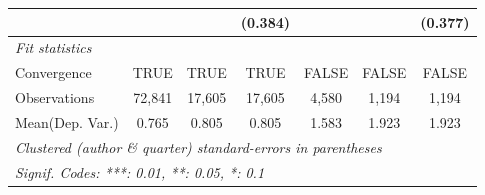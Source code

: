 \begin{tabular}{lcccccc}
                           &         &         & (0.384) &               &             & (0.377)\\   
   \midrule
   \emph{Fit statistics}\\
   Convergence             &TRUE     & TRUE    & TRUE    & FALSE         & FALSE       & FALSE\\  
   Observations            & 72,841  & 17,605  & 17,605  & 4,580         & 1,194       & 1,194\\  
Mean(Dep. Var.) & 0.765 & 0.805 & 0.805 & 1.583 & 1.923 & 1.923 \\
   \midrule \midrule
   \multicolumn{7}{l}{\emph{Clustered (author \& quarter) standard-errors in parentheses}}\\
   \multicolumn{7}{l}{\emph{Signif. Codes: ***: 0.01, **: 0.05, *: 0.1}}\\
\end{tabular}
\par\endgroup

